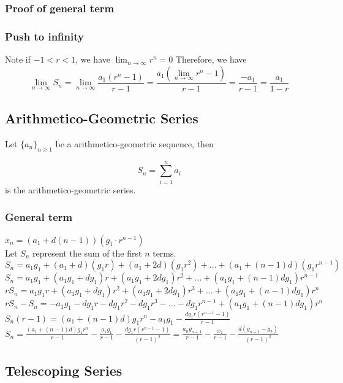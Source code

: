 \documentclass{article}
\begin{document}
\subsubsection{Proof of general term}
\vspace{30px}
\subsubsection{Push to infinity}

Note if $-1<r<1$, we have $\lim_{n \to \infty} r^n=0$
Therefore, we have $$\lim_{n \to \infty} S_n = \lim_{n \to \infty} \frac{a_1(r^{n}-1)}{r-1} = \frac{a_1(\lim_{n \to \infty} r^{n}-1)}{r-1} = \frac{-a_1}{r-1} = \frac{a_1}{1-r}$$

\subsection{Arithmetico-Geometric Series}

Let $\{a_n\}_{n\ge1}$ be a arithmetico-geometric sequence, then 

$$S_n=\sum_{i=1}^{n}a_i$$ 
is the arithmetico-geometric series.

\subsubsection{General term}
$x_n=(a_1+d(n-1))(g_1\cdot r^{n-1})$\\
Let $S_n$ represent the sum of the first $n$ terms. \\
$S_n=a_1g_1+(a_1+d)(g_1r)+(a_1+2d)(g_1r^2)+\ldots+(a_1+(n-1)d)(g_1r^{n-1})$\\
$S_n=a_1g_1+(a_1g_1+dg_1)r+(a_1g_1+2dg_1)r^2+\ldots+(a_1g_1+(n-1)dg_1)r^{n-1}$\\
$rS_n=a_1g_1r+(a_1g_1+dg_1)r^2+(a_1g_1+2dg_1)r^3+\ldots+(a_1g_1+(n-1)dg_1)r^{n}$\\
$rS_n-S_n=-a_1g_1-dg_1r-dg_1r^2-dg_1r^3-\ldots-dg_1r^{n-1}+(a_1g_1+(n-1)dg_1)r^n$\\
$S_n(r-1)=(a_1+(n-1)d)g_1r^n-a_1g_1-\frac{dg_1r(r^{n-1}-1)}{r-1}$\\
$S_n=\frac{(a_1+(n-1)d)g_1r^n}{r-1}-\frac{a_1g_1}{r-1}-\frac{dg_1r(r^{n-1}-1)}{(r-1)^2}=\frac{a_ng_{n+1}}{r-1}-\frac{x_1}{r-1}-\frac{d(g_{n+1}-g_2)}{(r-1)^2}$

\subsection{Telescoping Series}
\end{document}

